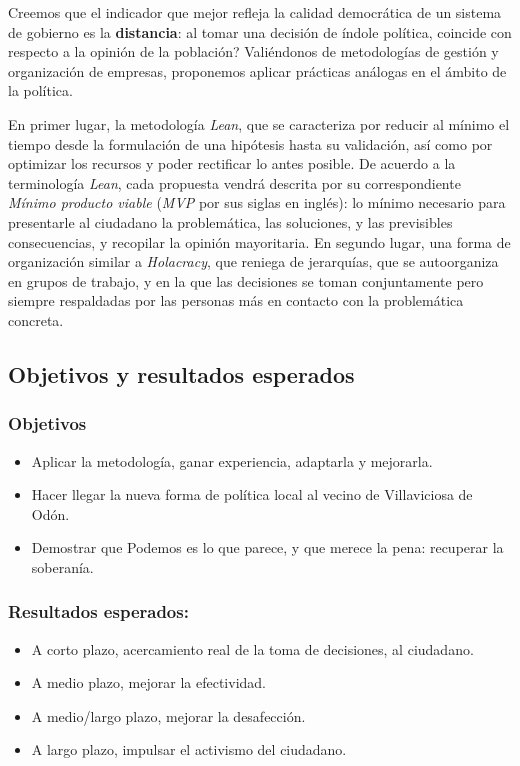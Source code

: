 \documentclass[11pt]{article}
\begin{document}
Creemos que el indicador que mejor refleja la calidad democrática de un sistema de gobierno es la \textbf{distancia}: al tomar una decisión de índole política, coincide con respecto a la opinión de la población?
Valiéndonos de metodologías de gestión y organización de empresas, proponemos aplicar prácticas análogas en el ámbito de la política.

En primer lugar, la metodología \emph{Lean}, que se caracteriza por reducir al mínimo el tiempo desde la formulación de una hipótesis hasta su validación, así como por optimizar los recursos y poder rectificar lo antes posible. De acuerdo a la terminología \emph{Lean}, cada propuesta vendrá descrita por su co\-rres\-pon\-dien\-te \emph{Mínimo producto viable} (\emph{MVP} por sus siglas en inglés): lo mínimo necesario para presentarle al ciudadano la problemática, las soluciones, y las previsibles consecuencias, y recopilar la opinión mayoritaria.
En segundo lugar, una forma de organización similar a \emph{Holacracy}, que reniega de jerarquías, que se autoorganiza en grupos de trabajo, y en la que las decisiones se toman conjuntamente pero siempre respaldadas por las personas más en contacto  con la problemática concreta.

\subsection{Objetivos y resultados esperados}
\label{sec-2-4}
\subsubsection{Objetivos}
\label{sec-2-4-1}
\begin{itemize}
\item Aplicar la metodología, ganar experiencia, adaptarla y mejorarla.
\item Hacer llegar la nueva forma de política local al vecino de Villaviciosa de Odón.
\item Demostrar que Podemos es lo que parece, y que merece la pena: recuperar la soberanía.
\end{itemize}
\subsubsection{Resultados esperados:}
\label{sec-2-4-2}
\begin{itemize}
\item A corto plazo, acercamiento real de la toma de decisiones, al ciudadano.
\item A medio plazo, mejorar la efectividad.
\item A medio/largo plazo, mejorar la desafección.
\item A largo plazo, impulsar el activismo del ciudadano.
\end{itemize}
\end{document}
